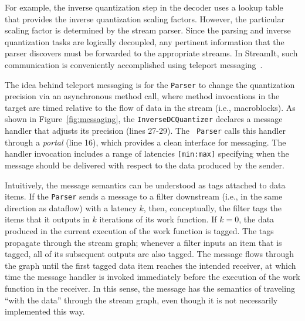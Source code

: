 For example, the inverse quantization step in the decoder uses a
lookup table that provides the inverse quantization scaling factors.
However, the particular scaling factor is determined by the stream
parser. Since the parsing and inverse quantization tasks are logically
decoupled, any pertinent information that the parser discovers must be
forwarded to the appropriate streams.  In StreamIt, such
communication is conveniently accomplished using teleport
messaging~\cite{thies05ppopp}.

The idea behind teleport messaging is for the {\tt Parser} to change
the quantization precision via an asynchronous method call, where
method invocations in the target are timed relative to the flow of
data in the stream (i.e., macroblocks). As shown in
Figure~\ref{fig:messaging}, the {\tt InverseDCQuantizer} declares a
message handler that adjusts its precision (lines 27-29). The {\tt
Parser} calls this handler through a {\it portal} (line 16), which
provides a clean interface for messaging.  The handler invocation
includes a range of latencies {\tt [min:max]} specifying when the
message should be delivered with respect to the data produced by the
sender.

Intuitively, the message semantics can be understood as tags
attached to data items.  If the {\tt Parser} sends a message to
a filter downstream (i.e., in the same direction as dataflow) with a
latency $k$, then, conceptually, the filter tags the items that it
outputs in $k$ iterations of its work function. If $k=0$, the data
produced in the current execution of the work function is tagged. The
tags propagate through the stream graph; whenever a filter inputs an
item that is tagged, all of its subsequent outputs are also
tagged. The message flows through the graph until the first tagged data
item reaches the intended receiver, at which time the message handler is
invoked immediately before the execution of the work function in the
receiver.  In this sense, the message has the semantics of traveling
``with the data'' through the stream graph, even though it is not
necessarily implemented this way.


